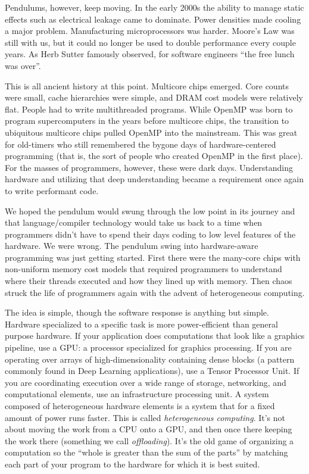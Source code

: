 Pendulums, however, keep moving.  In the early 2000s the ability to manage static effects such as electrical
leakage came to dominate.   Power densities made cooling a major problem.  Manufacturing  microprocessors was harder. Moore's Law was 
still with us, but it could no longer be used to double performance every couple years.
As Herb Sutter famously observed, for software engineers ``the free lunch was over''. 

This is all ancient history at this point.  Multicore chips emerged.  Core counts were small, cache hierarchies were 
simple, and DRAM cost models were relatively flat.   People had to write multithreaded programs.   While OpenMP
was born to program supercomputers in the years before multicore chips,
the transition to ubiquitous multicore chips pulled OpenMP into the mainstream.  This was great for 
old-timers who still remembered the bygone days of hardware-centered programming (that is, the sort of people 
who created OpenMP in the first place). For the masses of programmers, however, these were dark days.
Understanding hardware and utilizing that deep understanding became a requirement once again to write performant code.

We hoped the pendulum would swung through the low point in its journey and that language/compiler technology
would take us back to a time when programmers didn't have to spend their days coding to low level features of the
hardware.  We were wrong.  The pendulum swing into hardware-aware programming was just getting started.
First there were the many-core chips with non-uniform memory cost models that required programmers to understand
where their threads executed and how they lined up with memory.  Then chaos struck the life of programmers again with
the advent of heterogeneous computing.

The idea is simple, though the software response is anything but simple.  Hardware specialized to a specific task is
more power-efficient than general purpose hardware.   If your application does computations that look like a graphics pipeline, 
use a GPU: a processor specialized for graphics processing.  If you are operating over arrays of high-dimensionality containing dense blocks
(a pattern commonly found in Deep Learning applications), use a Tensor Processor Unit.  If
you are coordinating execution over a wide range of storage, networking, and computational elements, use an infrastructure
processing unit. A system composed of heterogeneous hardware elements is a system that for a fixed amount of power runs faster.
This is called \emph{heterogeneous computing}.   It's not about moving the work from a CPU onto a GPU, and then once there 
keeping the work there (something we call \emph{offloading}).   It's the old game of organizing a computation 
so the ``whole is greater than the sum of the parts'' by matching each part of your program to the hardware for which it is best suited.


